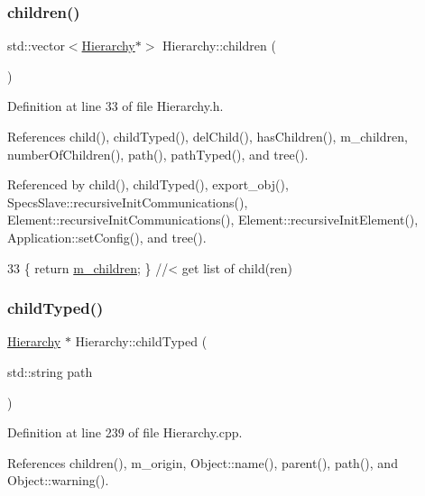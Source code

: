 \subsubsection{\texorpdfstring{children()}{children()}}
{\footnotesize\ttfamily std\+::vector$<$\hyperlink{classHierarchy}{Hierarchy}$\ast$$>$ Hierarchy\+::children (\begin{DoxyParamCaption}{ }\end{DoxyParamCaption})\hspace{0.3cm}{\ttfamily [inline]}}



Definition at line 33 of file Hierarchy.\+h.



References child(), child\+Typed(), del\+Child(), has\+Children(), m\+\_\+children, number\+Of\+Children(), path(), path\+Typed(), and tree().



Referenced by child(), child\+Typed(), export\+\_\+obj(), Specs\+Slave\+::recursive\+Init\+Communications(), Element\+::recursive\+Init\+Communications(), Element\+::recursive\+Init\+Element(), Application\+::set\+Config(), and tree().


\begin{DoxyCode}
33 \{ \textcolor{keywordflow}{return} \hyperlink{classHierarchy_a038816763941fd4a930504917f60483b}{m\_children};  \} \textcolor{comment}{//< get list of child(ren)}
\end{DoxyCode}
\mbox{\label{classHierarchy_a0c15a5276a3b80b4354d6bd8a01e0708}} 
\subsubsection{\texorpdfstring{child\+Typed()}{childTyped()}}
{\footnotesize\ttfamily \hyperlink{classHierarchy}{Hierarchy} $\ast$ Hierarchy\+::child\+Typed (\begin{DoxyParamCaption}\item[{std\+::string}]{path }\end{DoxyParamCaption})}



Definition at line 239 of file Hierarchy.\+cpp.



References children(), m\+\_\+origin, Object\+::name(), parent(), path(), and Object\+::warning().




